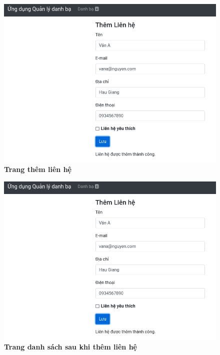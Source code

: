 {}
\setcounter{subsection}{5}
\setcounter{figure}{0}
\begin{figure}[H]
    \centering
    \includegraphics[width=15cm]{imgs/9.png}
    \caption{\bfseries Trang thêm liên hệ}
\end{figure}
\begin{figure}[H]
    \centering
    \includegraphics[width=15cm]{imgs/9.png}
    \caption{\bfseries Trang danh sách sau khi thêm liên hệ}
\end{figure}